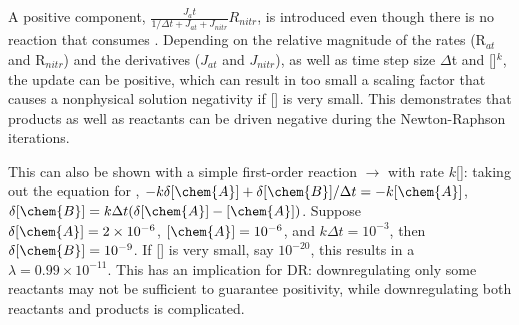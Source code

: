 \documentclass[gmd, manuscript]{copernicus}
\begin{document}
A positive component, $\frac{J_at}{1/\Delta t + J_{at} + J_{nitr}}
R_{nitr}$, is introduced even though there
is no reaction that consumes .  Depending on the relative magnitude of
the rates (R$_{at}$ and R$_{nitr}$) and the derivatives ($J_{at}$ and
$J_{nitr}$), as well as time step size $\Delta$t and []$^k$, the
update can be positive, which can result in too small a scaling factor that
causes a nonphysical solution negativity if [] is very small. This demonstrates
that products as well as reactants can be driven negative
during the Newton-Raphson iterations.

This can also be shown with a simple first-order reaction 
$\rightarrow$  with rate $k$[]: taking out the equation for
, $-k\delta[\chem{A}] + \delta[\chem{B}]/\Delta t = -k [\chem{A}]$,
$\delta[\chem{B}] = k\Delta t (\delta[\chem{A}] - [\chem{A}])$. Suppose 
$\delta[\chem{A}] = 2\times10^{-6}$,
$[\chem{A}]=10^{-6}$, and $k\Delta t = 10^{-3}$, then
$\delta[\chem{B}]=10^{-9}$. If [] is very small, say $10^{-20}$, this
results in a $\lambda=0.99\times 10^{-11}$. This has an implication for DR:
downregulating only some reactants may not be sufficient to guarantee
positivity, while downregulating both reactants and products is complicated.  

\end{document}
